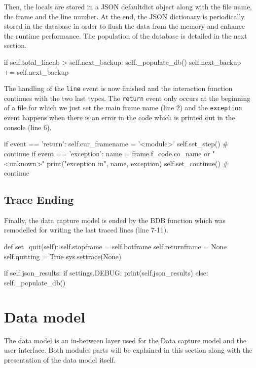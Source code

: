 Then, the locals are stored in a JSON defaultdict object along with the file name, the frame and the line number. At the end, the JSON dictionary is periodically stored in the database in order to flush the data from the memory and enhance the runtime performance. The population of the database is detailed in the next section.

\begin{python}
if self.total_linenb > self.next_backup:
    self._populate_db()
    self.next_backup += self.next_backup
\end{python}

The handling of the \texttt{line} event is now finished and the interaction function continues with the two last types. The \texttt{return} event only occurs at the beginning of a file for which we just set the main frame name (line 2) and the \texttt{exception} event happens when there is an error in the code which is printed out in the console (line 6).
\begin{python}
if event == 'return':
    self.cur_framename = '<module>'
    self.set_step()  # continue
if event == 'exception':
    name = frame.f_code.co_name or "<unknown>"
    print("exception in", name, exception)
    self.set_continue()  # continue
\end{python}

\subsection{Trace Ending}

Finally, the data capture model is ended by the  BDB function which was remodelled for writing the last traced lines (line 7-11).
\begin{python}
def set_quit(self):
    self.stopframe = self.botframe
    self.returnframe = None
    self.quitting = True
    sys.settrace(None)

    if self.json_results:
        if settings.DEBUG:
            print(self.json_results)
        else:
            self._populate_db()
\end{python}



\section{Data model}
The data model is an in-between layer used for the Data capture model and the user interface. Both modules parts will be explained in this section along with the presentation of the data model itself.

